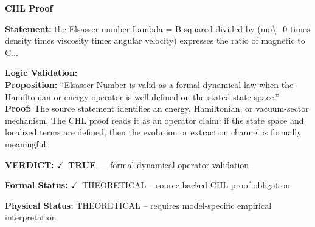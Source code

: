 \vspace{0.45em}
\noindent\textbf{CHL Proof}\par
\textbf{Statement:} the Elsasser number Lambda = B squared divided by (mu\textbackslash{}\_0 times density times viscosity
times angular velocity) expresses the ratio of magnetic to C...

\textbf{Logic Validation:}\\
\textbf{Proposition:} ``Elsasser Number is valid as a formal dynamical law when the Hamiltonian or energy
operator is well defined on the stated state space.''\\
\textbf{Proof:} The source statement identifies an energy, Hamiltonian, or vacuum-sector mechanism. The
CHL proof reads it as an operator claim: if the state space and localized terms are
defined, then the evolution or extraction channel is formally meaningful.

\textbf{VERDICT:} \ensuremath{\checkmark}\ \textbf{TRUE} --- formal dynamical-operator validation

\textbf{Formal Status:} \ensuremath{\checkmark}\ THEORETICAL -- source-backed CHL proof obligation

\textbf{Physical Status:} THEORETICAL -- requires model-specific empirical interpretation
\par\vspace{0.45em}
\par
\ifTZPDarkEdition
{}
\fi
\endgroup
\endgroup
